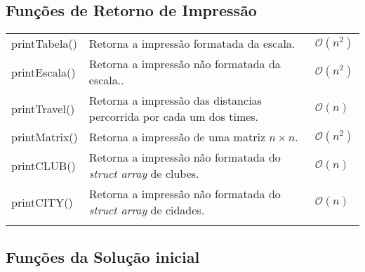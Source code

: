 \documentclass[12pt,a4paper]{article}
\numberwithin{figure}{section}
\numberwithin{table}{section}
\begin{document}
\subsection{Funções de Retorno de Impressão}
	
\begin{longtable}{>{\ttfamily}p{3cm} p{11cm} p{1cm}}
	printTabela() & Retorna a impressão formatada da escala. & $\mathcal{O}(n^2)$ \\
	printEscala() & Retorna a impressão não formatada da escala.. & $\mathcal{O}(n^2)$ \\
	printTravel() & Retorna a impressão das distancias percorrida por cada um dos times. & $\mathcal{O}(n)$ \\
	printMatrix() & Retorna a impressão de uma matriz $n \times n$. & $\mathcal{O}(n^2)$ \\
	printCLUB() & Retorna a impressão não formatada do \textit{struct array} de clubes. & $\mathcal{O}(n)$ \\
	printCITY() & Retorna a impressão não formatada do \textit{struct array} de cidades. & $\mathcal{O}(n)$ \\
	\label{tab:print}
\end{longtable}
\vspace{-0.5cm}

\subsection{Funções da Solução inicial}
	
\end{document}
